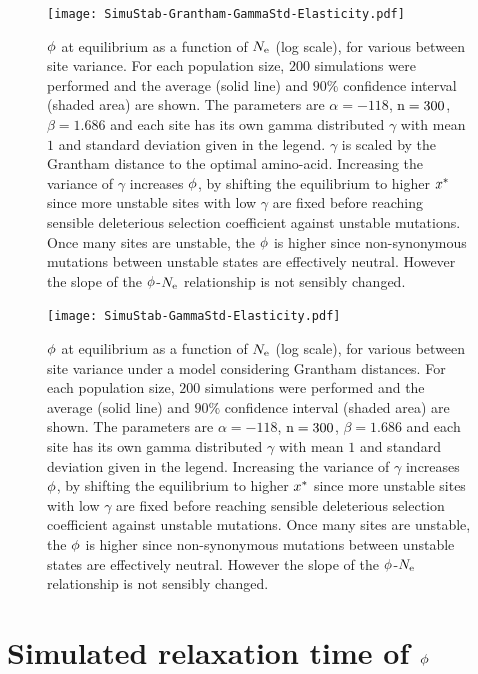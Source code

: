 \begin{figure}[H]
	\centering
	\texttt{[image: SimuStab-Grantham-GammaStd-Elasticity.pdf]}
	\caption[Effect of site variance on the susceptibility]{
	$\phi$ at equilibrium as a function of $N_{\mathrm{e}}$ (log scale), for various between site variance.
	For each population size, $200$ simulations were performed and the average (solid line) and $90\%$ confidence interval (shaded area) are shown.
	The parameters are $\alpha=-118$, $\text{n}=300$, $\beta=1.686$ and each site has its own gamma distributed $\gamma$ with mean $1$ and standard deviation given in the legend. $\gamma$ is scaled by the Grantham distance to the optimal amino-acid.
	Increasing the variance of $\gamma$ increases $\phi$, by shifting the equilibrium to higher $x^{*}$ since more unstable sites with low $\gamma$ are fixed before reaching sensible deleterious selection coefficient against unstable mutations. Once many sites are unstable, the $\phi$ is higher since non-synonymous mutations between unstable states are effectively neutral. However the slope of the $\phi$-$N_{\mathrm{e}}$ relationship is not sensibly changed.
	}
\end{figure}

\begin{figure}[H]
	\centering
	\texttt{[image: SimuStab-GammaStd-Elasticity.pdf]}
	\caption[Effect of site variance on the susceptibility without Grantham distance]{
	$\phi$ at equilibrium as a function of $N_{\mathrm{e}}$ (log scale), for various between site variance under a model considering Grantham distances.
	For each population size, $200$ simulations were performed and the average (solid line) and $90\%$ confidence interval (shaded area) are shown.
	The parameters are $\alpha=-118$, $\text{n}=300$, $\beta=1.686$ and each site has its own gamma distributed $\gamma$ with mean $1$ and standard deviation given in the legend.
	Increasing the variance of $\gamma$ increases $\phi$, by shifting the equilibrium to higher $x^{*}$ since more unstable sites with low $\gamma$ are fixed before reaching sensible deleterious selection coefficient against unstable mutations. Once many sites are unstable, the $\phi$ is higher since non-synonymous mutations between unstable states are effectively neutral. However the slope of the $\phi$-$N_{\mathrm{e}}$ relationship is not sensibly changed.
	}
\end{figure}

\section{Simulated relaxation time of \texorpdfstring{$\phi$}{φ}}

